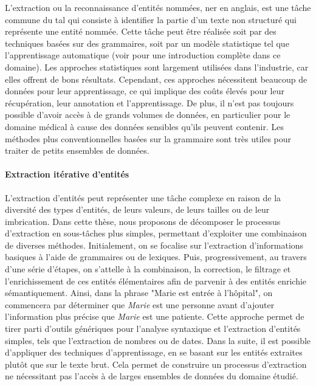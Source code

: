 L'extraction ou la reconnaissance d'entités nommées, \gls{ner} en anglais, est une tâche commune du \gls{tal} qui consiste à identifier la partie d'un texte non structuré qui représente une entité nommée.
Cette tâche peut être réalisée soit par des techniques basées sur des grammaires, soit par un modèle statistique tel que l'apprentissage automatique (voir \cite{jurafskySpeechLanguageProcessing2009} pour une introduction complète dans ce domaine).
Les approches statistiques sont largement utilisées dans l'industrie, car elles offrent de bons résultats.
Cependant, ces approches nécessitent beaucoup de données pour leur apprentissage, ce qui implique des coûts élevés pour leur récupération, leur annotation et l'apprentissage.
De plus, il n'est pas toujours possible d'avoir accès à de grands volumes de données, en particulier pour le domaine médical à cause des données sensibles qu'ils peuvent contenir.
Les méthodes plus conventionnelles basées sur la grammaire sont très utiles pour traiter de petits ensembles de données.

\paragraph{Extraction itérative d'entités}
L'extraction d'entités peut représenter une tâche complexe en raison de la diversité des types d'entités, de leurs valeurs, de leurs tailles ou de leur imbrication.
Dans cette thèse, nous proposons de décomposer le processus d'extraction en sous-tâches plus simples, permettant d'exploiter une combinaison de diverses méthodes.
Initialement, on se focalise sur l'extraction d'informations basiques à l'aide de grammaires ou de lexiques.
Puis, progressivement, au travers d'une série d'étapes, on s'attelle à la combinaison, la correction, le filtrage et l'enrichissement de ces entités élémentaires afin de parvenir à des entités enrichie sémantiquement.
Ainsi, dans la phrase "Marie est entrée à l'hôpital", on commencera par déterminer que \emph{Marie} est une personne avant d'ajouter l'information plus précise que \emph{Marie} est une patiente.
Cette approche permet de tirer parti d'outils génériques pour l'analyse syntaxique et l'extraction d'entités simples, tels que l'extraction de nombres ou de dates.
Dans la suite, il est possible d'appliquer des techniques d'apprentissage, en se basant sur les entités extraites plutôt que sur le texte brut.
Cela permet de construire un processus d'extraction ne nécessitant pas l'accès à de larges ensembles de données du domaine étudié.

